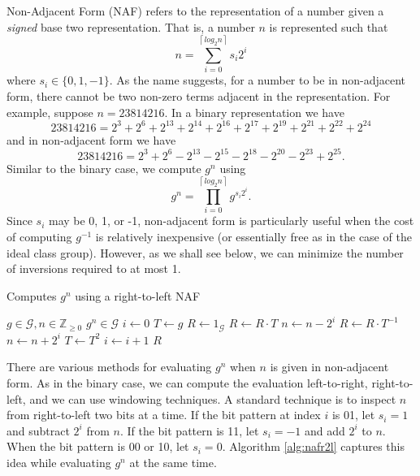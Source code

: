 \documentclass{ucalgthes1}
\theoremstyle{plain}
\theoremstyle{definition}
\newcommand{\ZZgez}{\mathbb{Z}_{\ge 0}}
\newcommand{\floor}[1]{\left\lfloor #1 \right\rfloor}
\newcommand{\ceil}[1]{\left\lceil #1 \right\rceil}
\begin{document}
Non-Adjacent Form (NAF) refers to the representation of a number given a \emph{signed} base two representation.  That is, a number $n$ is represented such that
\[
	n = \sum_{i=0}^{\ceil{log_2 n}} s_i 2^i
\]
where $s_i \in \{0, 1, -1\}$.  As the name suggests, for a number to be in non-adjacent form, there cannot be two non-zero terms adjacent in the representation.  For example, suppose $n = 23814216$.  In a binary representation we have
\begin{equation}\label{eq:binaryEg}
	23814216 = 2^3+2^6+2^{13}+2^{14}+2^{16}+2^{17}+2^{19}+2^{21}+2^{22}+2^{24}
\end{equation}
and in non-adjacent form we have
\begin{equation}\label{eq:nafEg}
	23814216 = 2^3+2^6-2^{13}-2^{15}-2^{18}-2^{20}-2^{23}+2^{25}.
\end{equation}
Similar to the binary case, we compute $g^n$ using
\[
	g^n = \prod _{i=0}^{\ceil{log_2 n}} g^{s_i 2^i}.
\]
Since $s_i$ may be 0, 1, or -1, non-adjacent form is particularly useful when the cost of computing $g^{-1}$ is relatively inexpensive (or essentially free as in the case of the ideal class group).  However, as we shall see below, we can minimize the number of inversions required to at most 1.

\begin{algorithm}[htb!]
\caption{Computes $g^n$ using a right-to-left NAF}\label{alg:nafr2l}
\begin{algorithmic}[1]
\REQUIRE $g \in \mathcal G, n \in \ZZgez$
\ENSURE $g^n \in \mathcal G$
\STATE $i \gets 0$
\STATE $T \gets g$ 
\STATE $R \gets 1_{\mathcal G}$
	\IF {$\floor{n/2^i} \equiv 1 \pmod 4$}
		\STATE $R \gets R \cdot T$
		\STATE $n \gets n-2^i$
	\ELSIF {$\floor{n/2^i} \equiv 3 \pmod 4$}
		\STATE $R \gets R \cdot T^{-1}$
		\STATE $n \gets n+2^i$
	\ENDIF
	\STATE $T \gets T^2$
	\STATE $i \gets i + 1$
\ENDWHILE
\RETURN $R$
\end{algorithmic}
\end{algorithm}

There are various methods for evaluating $g^n$ when $n$ is given in non-adjacent form.  As in the binary case, we can compute the evaluation left-to-right, right-to-left, and we can use windowing techniques.  A standard technique is to inspect $n$ from right-to-left two bits at a time.  If the bit pattern at index $i$ is 01, let $s_i = 1$ and subtract $2^i$ from $n$.  If the bit pattern is 11, let $s_i = -1$ and add $2^i$ to $n$.  When the bit pattern is 00 or 10, let $s_i =0$.  Algorithm \ref{alg:nafr2l} captures this idea while evaluating $g^n$ at the same time.
\end{document}

